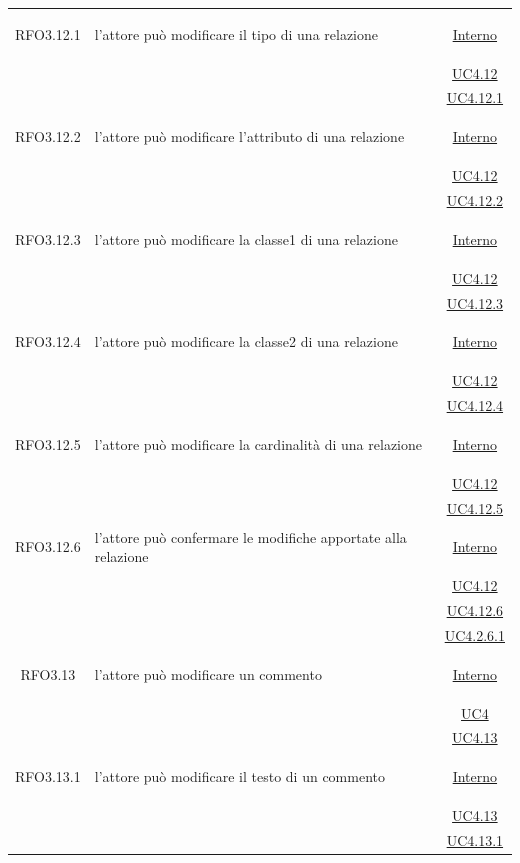 \begin{longtable}{|c|>{\centering}m{7cm}|c|}
\hypertarget{RFO3.12.1}{RFO3.12.1} & l'attore può modificare il tipo di una relazione &  \hyperlink{Interno}{Interno}\\
& &\hyperref[UC4.12]{UC4.12}\\
& &\hyperref[UC4.12.1]{UC4.12.1}\\ \hline

\hypertarget{RFO3.12.2}{RFO3.12.2} & l'attore può modificare l'attributo di una relazione &  \hyperlink{Interno}{Interno}\\
& &\hyperref[UC4.12]{UC4.12}\\
& &\hyperref[UC4.12.2]{UC4.12.2}\\ \hline

\hypertarget{RFO3.12.3}{RFO3.12.3} & l'attore può modificare la classe1 di una relazione &  \hyperlink{Interno}{Interno}\\
& &\hyperref[UC4.12]{UC4.12}\\
& &\hyperref[UC4.12.3]{UC4.12.3}\\ \hline

\hypertarget{RFO3.12.4}{RFO3.12.4} & l'attore può modificare la classe2 di una relazione &  \hyperlink{Interno}{Interno}\\
& &\hyperref[UC4.12]{UC4.12}\\
& &\hyperref[UC4.12.4]{UC4.12.4}\\ \hline

\hypertarget{RFO3.12.5}{RFO3.12.5} & l'attore può modificare la cardinalità di una relazione &  \hyperlink{Interno}{Interno}\\
& &\hyperref[UC4.12]{UC4.12}\\
& &\hyperref[UC4.12.5]{UC4.12.5}\\ \hline

\hypertarget{RFO3.12.6}{RFO3.12.6} & l'attore può confermare le modifiche apportate alla relazione &  \hyperlink{Interno}{Interno}\\
& &\hyperref[UC4.12]{UC4.12}\\
& &\hyperref[UC4.12.6]{UC4.12.6}\\
& &\hyperref[UC4.2.6.1]{UC4.2.6.1}\\ \hline

\hypertarget{RFO3.13}{RFO3.13} & l'attore può modificare un commento &  \hyperlink{Interno}{Interno}\\
& &\hyperref[UC4]{UC4}\\
& &\hyperref[UC4.13]{UC4.13}\\ \hline

\hypertarget{RFO3.13.1}{RFO3.13.1} & l'attore può modificare il testo di un commento &  \hyperlink{Interno}{Interno}\\
& &\hyperref[UC4.13]{UC4.13}\\
& &\hyperref[UC4.13.1]{UC4.13.1}\\ \hline


\end{longtable}
